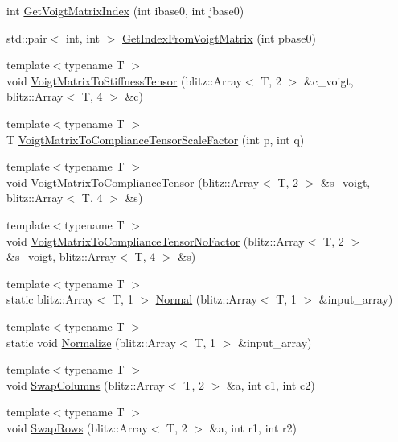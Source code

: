 \begin{DoxyCompactItemize}
\item 
int \mbox{\hyperlink{namespacempc_1_1utilities_ab6036c49506f59bdc9d5e522df98f24a}{Get\+Voigt\+Matrix\+Index}} (int ibase0, int jbase0)
\item 
std\+::pair$<$ int, int $>$ \mbox{\hyperlink{namespacempc_1_1utilities_a3068edcfc9812e8161b332a659ededaa}{Get\+Index\+From\+Voigt\+Matrix}} (int pbase0)
\item 
{\footnotesize template$<$typename T $>$ }\\void \mbox{\hyperlink{namespacempc_1_1utilities_ad181e7080d74d1e523e872bc8ff53f5e}{Voigt\+Matrix\+To\+Stiffness\+Tensor}} (blitz\+::\+Array$<$ T, 2 $>$ \&c\+\_\+voigt, blitz\+::\+Array$<$ T, 4 $>$ \&c)
\item 
{\footnotesize template$<$typename T $>$ }\\T \mbox{\hyperlink{namespacempc_1_1utilities_afd7cbb4c9bcff1896e7151eae95369ae}{Voigt\+Matrix\+To\+Compliance\+Tensor\+Scale\+Factor}} (int p, int q)
\item 
{\footnotesize template$<$typename T $>$ }\\void \mbox{\hyperlink{namespacempc_1_1utilities_a14f790d9a892452ed500ba8d7caf0222}{Voigt\+Matrix\+To\+Compliance\+Tensor}} (blitz\+::\+Array$<$ T, 2 $>$ \&s\+\_\+voigt, blitz\+::\+Array$<$ T, 4 $>$ \&s)
\item 
{\footnotesize template$<$typename T $>$ }\\void \mbox{\hyperlink{namespacempc_1_1utilities_af0464cc342675cdd798936b674ceb8a9}{Voigt\+Matrix\+To\+Compliance\+Tensor\+No\+Factor}} (blitz\+::\+Array$<$ T, 2 $>$ \&s\+\_\+voigt, blitz\+::\+Array$<$ T, 4 $>$ \&s)
\item 
{\footnotesize template$<$typename T $>$ }\\static blitz\+::\+Array$<$ T, 1 $>$ \mbox{\hyperlink{namespacempc_1_1utilities_acc0a66ea58c515cc13d5a0a79439c639}{Normal}} (blitz\+::\+Array$<$ T, 1 $>$ \&input\+\_\+array)
\item 
{\footnotesize template$<$typename T $>$ }\\static void \mbox{\hyperlink{namespacempc_1_1utilities_a2b888b4e5d7d4fe16a1c97c120d0494f}{Normalize}} (blitz\+::\+Array$<$ T, 1 $>$ \&input\+\_\+array)
\item 
{\footnotesize template$<$typename T $>$ }\\void \mbox{\hyperlink{namespacempc_1_1utilities_a86772b476b0e0aa1567f42c8a9aa7a3c}{Swap\+Columns}} (blitz\+::\+Array$<$ T, 2 $>$ \&a, int c1, int c2)
\item 
{\footnotesize template$<$typename T $>$ }\\void \mbox{\hyperlink{namespacempc_1_1utilities_a7dc82dae028a331f955ec8a5aa3599a4}{Swap\+Rows}} (blitz\+::\+Array$<$ T, 2 $>$ \&a, int r1, int r2)
\end{DoxyCompactItemize}
